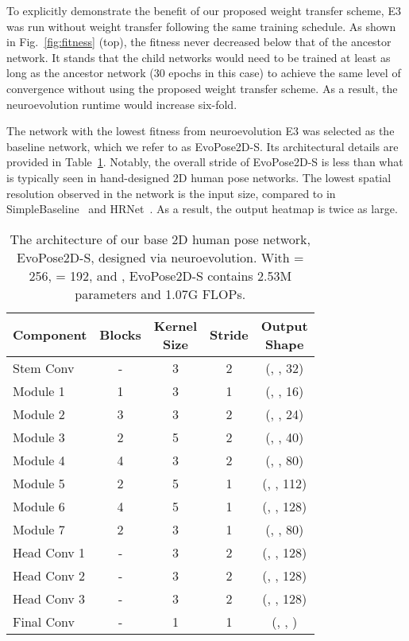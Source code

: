 \documentclass{ieeeaccess}
\begin{document}
To explicitly demonstrate the benefit of our proposed weight transfer scheme, E3 was run without weight transfer following the same training schedule. As shown in Fig.\ \ref{fig:fitness} (top), the fitness never decreased below that of the ancestor network. It stands that the child networks would need to be trained at least as long as the ancestor network (30 epochs in this case) to achieve the same level of convergence without using the proposed weight transfer scheme. As a result, the neuroevolution runtime would increase six-fold. 

The network with the lowest fitness from neuroevolution E3 was selected as the baseline network, which we refer to as EvoPose2D-S. Its architectural details are provided in Table~\ref{tab:evopose2d-s}. Notably, the overall stride of EvoPose2D-S is less than what is typically seen in hand-designed 2D human pose networks. The lowest spatial resolution observed in the network is  the input size, compared to  in SimpleBaseline~\cite{xiao2018simple} and HRNet~\cite{sun2019deep}. As a result, the output heatmap is twice as large.

\begin{table}
	\footnotesize
	\centering
	\renewcommand\arraystretch{1.3}
	\begin{tabular}{l|c|c|c|c}
		\hline
		Component & Blocks & \makecell{Kernel\\Size} & Stride & \makecell{Output\\Shape}\\
		\hline
		Stem Conv & - & 3 & 2 & (, , 32)\\
		\hline
		Module 1 & 1 & 3 & 1 & (, , 16)\\
		Module 2 & 3 & 3 & 2 & (, , 24)\\
		Module 3 & 2 & 5 & 2 & (, , 40)\\
		Module 4 & 4 & 3 & 2 & (, , 80)\\
		Module 5 & 2 & 5 & 1 & (, , 112)\\
		Module 6 & 4 & 5 & 1 & (, , 128)\\
		Module 7 & 2 & 3 & 1 & (, , 80)\\
		\hline
		Head Conv 1 & - & 3 & 2 & (, , 128)\\
		Head Conv 2 & - & 3 & 2 & (, , 128)\\
		Head Conv 3 & - & 3 & 2 & (, , 128)\\
		\hline
		Final Conv & - & 1 & 1 & (, , )\\
		\hline
	\end{tabular}
\caption{The architecture of our base 2D human pose network, EvoPose2D-S, designed via neuroevolution. With  = 256,  = 192, and , EvoPose2D-S contains 2.53M parameters and 1.07G FLOPs.}
\label{tab:evopose2d-s}
\end{table}
\end{document}
